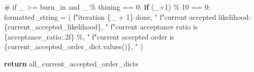 \documentclass[
  letterpaper,
  DIV=11,
  numbers=noendperiod]{scrreprt}
\newenvironment{Shaded}{\begin{snugshade}}{\end{snugshade}}
\newcommand{\CommentTok}[1]{\textcolor[rgb]{0.37,0.37,0.37}{#1}}
\newcommand{\ControlFlowTok}[1]{\textcolor[rgb]{0.00,0.23,0.31}{\textbf{#1}}}
\newcommand{\DecValTok}[1]{\textcolor[rgb]{0.68,0.00,0.00}{#1}}
\newcommand{\NormalTok}[1]{\textcolor[rgb]{0.00,0.23,0.31}{#1}}
\newcommand{\OperatorTok}[1]{\textcolor[rgb]{0.37,0.37,0.37}{#1}}
\newcommand{\SpecialCharTok}[1]{\textcolor[rgb]{0.37,0.37,0.37}{#1}}
\newcommand{\SpecialStringTok}[1]{\textcolor[rgb]{0.13,0.47,0.30}{#1}}
\begin{document}
\begin{Shaded}
\begin{Highlighting}[]
        \CommentTok{\# if \_ \textgreater{}= burn\_in and \_ \% thining == 0:}
        \ControlFlowTok{if}\NormalTok{ (\_}\OperatorTok{+}\DecValTok{1}\NormalTok{) }\OperatorTok{\%} \DecValTok{10} \OperatorTok{==} \DecValTok{0}\NormalTok{:}
\NormalTok{            formatted\_string }\OperatorTok{=}\NormalTok{ (}
                \SpecialStringTok{f"iteration }\SpecialCharTok{\{}\NormalTok{\_ }\OperatorTok{+} \DecValTok{1}\SpecialCharTok{\}}\SpecialStringTok{ done, "}
                \SpecialStringTok{f"current accepted likelihood: }\SpecialCharTok{\{}\NormalTok{current\_accepted\_likelihood}\SpecialCharTok{\}}\SpecialStringTok{, "}
                \SpecialStringTok{f"current acceptance ratio is }\SpecialCharTok{\{}\NormalTok{acceptance\_ratio}\SpecialCharTok{:.2f\}}\SpecialStringTok{ \%, "}
                \SpecialStringTok{f"current accepted order is }\SpecialCharTok{\{}\NormalTok{current\_accepted\_order\_dict}\SpecialCharTok{.}\NormalTok{values()}\SpecialCharTok{\}}\SpecialStringTok{, "}
\NormalTok{            )}
            
    \ControlFlowTok{return}\NormalTok{ all\_current\_accepted\_order\_dicts}
\end{Highlighting}
\end{Shaded}
\end{document}
